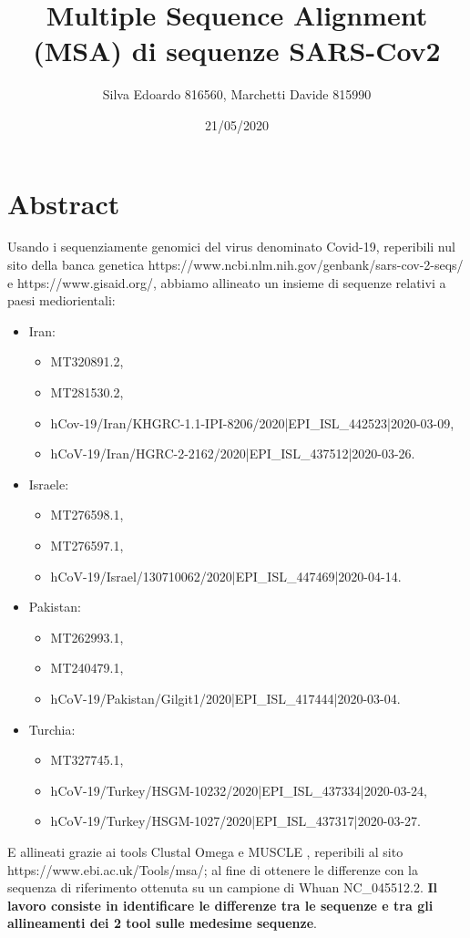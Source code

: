 \documentclass[12pt]{article}
\title{Multiple Sequence Alignment (MSA) di sequenze SARS-Cov2}
\date{21/05/2020}
\author{Silva Edoardo 816560, Marchetti Davide 815990}
\begin{document}
\maketitle

\section*{Abstract}

	Usando i sequenziamente genomici del virus denominato Covid-19, reperibili nul sito della banca genetica https://www.ncbi.nlm.nih.gov/genbank/sars-cov-2-seqs/ e https://www.gisaid.org/, abbiamo allineato un insieme di sequenze relativi a paesi mediorientali:
	\begin{itemize} %
		\item Iran: %
		\begin{itemize}
			\item MT320891.2, 
			\item MT281530.2, 
			\item hCov-19/Iran/KHGRC-1.1-IPI-8206/2020|EPI\_ISL\_442523|2020-03-09,
			\item hCoV-19/Iran/HGRC-2-2162/2020|EPI\_ISL\_437512|2020-03-26. 
		 \end{itemize}
		\item Israele:
		\begin{itemize}
			\item MT276598.1, 
			\item MT276597.1, 
			\item hCoV-19/Israel/130710062/2020|EPI\_ISL\_447469|2020-04-14.
		 \end{itemize}
		\item Pakistan: 
		\begin{itemize}
			\item MT262993.1, 
			\item MT240479.1, 
			\item hCoV-19/Pakistan/Gilgit1/2020|EPI\_ISL\_417444|2020-03-04.
		 \end{itemize}
		\item Turchia: 
		\begin{itemize}
			\item MT327745.1,
			\item hCoV-19/Turkey/HSGM-10232/2020|EPI\_ISL\_437334|2020-03-24,
			\item hCoV-19/Turkey/HSGM-1027/2020|EPI\_ISL\_437317|2020-03-27.
		 \end{itemize}
	\end{itemize}
	E allineati grazie ai tools Clustal Omega e MUSCLE , reperibili al sito https://www.ebi.ac.uk/Tools/msa/; al fine di ottenere le differenze con la sequenza di riferimento ottenuta su un campione di Whuan NC\_045512.2.\newline
	\textbf{Il lavoro consiste in identificare le differenze tra le sequenze e tra gli allineamenti dei 2 tool sulle medesime sequenze}. \newpage
\end{document}
